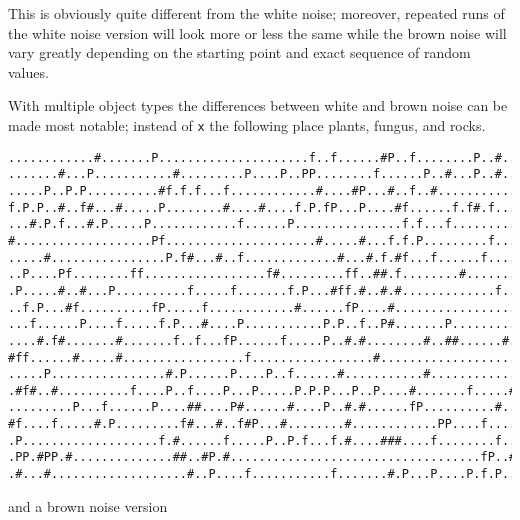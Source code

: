 \documentclass[12pt,a4paper]{article}
\begin{document}
This is obviously quite different from the white noise; moreover,
repeated runs of the white noise version will look more or less the same
while the brown noise will vary greatly depending on the starting point
and exact sequence of random values.

With multiple object types the differences between white and brown noise
can be made most notable; instead of \texttt{x} the following place
plants, fungus, and rocks.

\begin{verbatim}
............#.......P.....................f..f......#P..f........P..#..P
.......#...P...........#.........P....P..PP........f......P..#...P..#..f
.....P..P.P..........#f.f.f...f............#....#P...#..f..#............
f.P.P..#..f#...#.....P........#....#....f.P.fP...P....#f......f.f#.f....
...#.P.f...#.P.....P............f......P...............f.f...f..........
#...................Pf.....................#.....#...f.f.P.........f...P
.....#................P.f#...#..f.............#...#.f.#f...f......f....P
..P....Pf........ff.................f#.........ff..##.f........#........
.P.....#..#...P..........f.....f.......f.P...#ff.#..#.#.............f...
..f.P...#f..........fP.....f............#......fP....#..................
...f......P....f.....f.P...#....P...........P.P..f..P#.......P..........
....#.f#.......#.......f..f...fP......f.....P..#.#........#..##......#.P
#ff......#.....#.................f.................#....................
.....P................#.P......P....P..f......#...........#.............
.#f#..#..........f....P..f....P...P.....P.P.P...P..P....#.......f.....#.
.........P...f......P....##....P#......#....P..#.#......fP..........#...
#f....f.....#.P.........f#...#..f#P...#........#............PP....f....#
.P...................f.#......f.....P..P.f...f.#....###....f........f..f
.PP.#PP.#..............##..#P.#...................................fP..#.
.#...#...................#..P....f...........f.......#.P...P....P.f.P..f
\end{verbatim}

and a brown noise version
\end{document}
